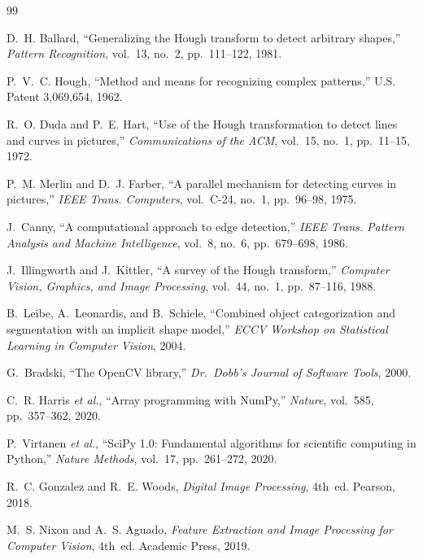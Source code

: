 \documentclass[12pt,a4paper]{article}
\begin{document}
\begin{thebibliography}{99}

D.~H. Ballard,
``Generalizing the Hough transform to detect arbitrary shapes,''
\textit{Pattern Recognition}, vol.~13, no.~2, pp.~111--122, 1981.

P.~V.~C. Hough,
``Method and means for recognizing complex patterns,''
U.S. Patent 3,069,654, 1962.

R.~O. Duda and P.~E. Hart,
``Use of the Hough transformation to detect lines and curves in pictures,''
\textit{Communications of the ACM}, vol.~15, no.~1, pp.~11--15, 1972.

P.~M. Merlin and D.~J. Farber,
``A parallel mechanism for detecting curves in pictures,''
\textit{IEEE Trans. Computers}, vol.~C-24, no.~1, pp.~96--98, 1975.

J.~Canny,
``A computational approach to edge detection,''
\textit{IEEE Trans. Pattern Analysis and Machine Intelligence},
vol.~8, no.~6, pp.~679--698, 1986.

J.~Illingworth and J.~Kittler,
``A survey of the Hough transform,''
\textit{Computer Vision, Graphics, and Image Processing},
vol.~44, no.~1, pp.~87--116, 1988.

B.~Leibe, A.~Leonardis, and B.~Schiele,
``Combined object categorization and segmentation with an implicit shape model,''
\textit{ECCV Workshop on Statistical Learning in Computer Vision}, 2004.

G.~Bradski,
``The OpenCV library,''
\textit{Dr.\ Dobb's Journal of Software Tools}, 2000.

C.~R. Harris \textit{et al.},
``Array programming with NumPy,''
\textit{Nature}, vol.~585, pp.~357--362, 2020.

P.~Virtanen \textit{et al.},
``SciPy 1.0: Fundamental algorithms for scientific computing in Python,''
\textit{Nature Methods}, vol.~17, pp.~261--272, 2020.

R.~C. Gonzalez and R.~E. Woods,
\textit{Digital Image Processing}, 4th~ed.
Pearson, 2018.

M.~S. Nixon and A.~S. Aguado,
\textit{Feature Extraction and Image Processing for Computer Vision}, 4th~ed.
Academic Press, 2019.

\end{thebibliography}
\end{document}
